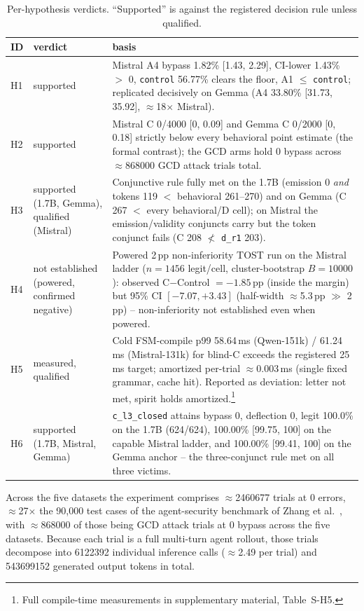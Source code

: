 \begin{table}[t]
\centering
\footnotesize
\caption{Per-hypothesis verdicts. ``Supported'' is against the registered decision rule unless qualified.}
\label{tab:ledger}
\begin{tabular}{l l p{6.3cm}}
\toprule
ID & verdict & basis \\
\midrule
H1 & supported & Mistral A4 bypass 1.82\% [1.43, 2.29], CI-lower 1.43\% $>$ 0, \texttt{control} 56.77\% clears the floor, A1 $\leq$ \texttt{control}; replicated decisively on Gemma (A4 33.80\% [31.73, 35.92], $\approx$18$\times$ Mistral). \\
H2 & supported & Mistral C 0/\num{4000} [0, 0.09] and Gemma C 0/\num{2000} [0, 0.18] strictly below every behavioral point estimate (the formal contrast); the GCD arms hold 0 bypass across $\approx$\num{868000} GCD attack trials total. \\
H3 & supported (1.7B, Gemma), qualified (Mistral) & Conjunctive rule fully met on the 1.7B (emission 0 \emph{and} tokens 119 $<$ behavioral 261--270) and on Gemma (C 267 $<$ every behavioral/D cell); on Mistral the emission/validity conjuncts carry but the token conjunct fails (C 208 $\not<$ \texttt{d\_r1} 203). \\
H4 & not established (powered, confirmed negative) & Powered 2\,pp non-inferiority TOST run on the Mistral ladder ($n=\num{1456}$ legit/cell, cluster-bootstrap $B=\num{10000}$): observed C$-$Control $=-1.85$\,pp (inside the margin) but 95\% CI $[-7.07, +3.43]$ (half-width $\approx$5.3\,pp $\gg$ 2\,pp) -- non-inferiority not established even when powered. \\
H5 & measured, qualified & Cold FSM-compile p99 58.64\,ms (Qwen-151k) / 61.24\,ms (Mistral-131k) for blind-C exceeds the registered 25\,ms target; amortized per-trial $\approx$0.003\,ms (single fixed grammar, cache hit). Reported as deviation: letter not met, spirit holds amortized.\footnote{Full compile-time measurements in supplementary material, Table~S-H5.} \\
H6 & supported (1.7B, Mistral, Gemma) & \texttt{c\_l3\_closed} attains bypass 0, deflection 0, legit 100.0\% on the 1.7B (624/624), 100.00\% [99.75, 100] on the capable Mistral ladder, and 100.00\% [99.41, 100] on the Gemma anchor -- the three-conjunct rule met on all three victims. \\
\bottomrule
\end{tabular}
\end{table}

Across the five datasets the experiment comprises $\approx$\num{2460677} trials at 0 errors, $\approx$27$\times$ the 90{,}000 test cases of the agent-security benchmark of Zhang et al.\ \cite{zhang2024asb}, with $\approx$\num{868000} of those being GCD attack trials at 0 bypass across the five datasets. Because each trial is a full multi-turn agent rollout, those trials decompose into \num{6122392} individual inference calls ($\approx$2.49 per trial) and \num{543699152} generated output tokens in total.

